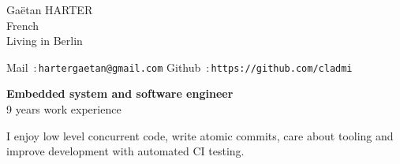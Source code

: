\documentclass{cv}
\begin{document}
\begin{chapeau}
\hspace{1cm}
\begin{adresse}
        Gaëtan HARTER\\
        French \\
        Living in Berlin
\end{adresse}
\begin{etatcivil}
        Mail~:\,\texttt{hartergaetan@gmail.com}
        Github~:\,\texttt{https://github.com/cladmi}
\end{etatcivil}
\hspace{2cm}
\end{chapeau}

\begin{center}
        \textbf{\Large Embedded system and software engineer\\}
        \large 9 years work experience\\

        \vspace{0.5em}
        \begin{minipage}{15cm}
          \begin{center}
            \large I enjoy low level concurrent code, write atomic commits, care about tooling and improve development with automated CI testing.
          \end{center}
        \end{minipage}
\end{center}
\end{document}
